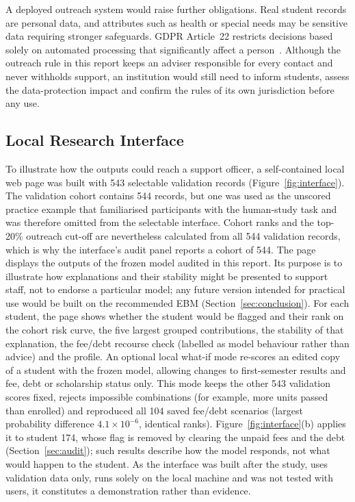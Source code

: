 A deployed outreach system would raise further obligations. Real student records are personal data,
and attributes such as health or special needs may be sensitive data requiring stronger safeguards.
GDPR Article~22 restricts decisions based solely on automated processing that significantly affect a
person~\citep{gdpr2016,wachter2017counterfactual}. Although the outreach rule in this report keeps an
adviser responsible for every contact and never withholds support, an institution would still need
to inform students, assess the data-protection impact and confirm the rules of its own jurisdiction
before any use.

\subsection{Local Research Interface}
\label{sec:app-interface}

To illustrate how the outputs could reach a support officer, a self-contained local web page was
built with 543 selectable validation records (Figure~\ref{fig:interface}). The validation cohort
contains 544 records, but one was used as the unscored practice example that familiarised
participants with the human-study task and was therefore omitted from the selectable interface.
Cohort ranks and the top-20\% outreach cut-off are nevertheless calculated from all 544 validation
records, which is why the interface's audit panel reports a cohort of 544. The page displays the
outputs of the frozen \tabicl model audited in this report. Its purpose is to illustrate
how explanations and their stability might be presented to support staff, not to endorse a
particular model; any future version intended for practical use would be built on the recommended
EBM (Section~\ref{sec:conclusion}). For each
student, the page shows whether the student would be flagged and their rank on the cohort risk
curve, the five largest grouped contributions, the stability of that explanation, the fee/debt
recourse check (labelled as model behaviour rather than advice) and the profile. An optional local
what-if mode re-scores an edited copy of a student with the frozen \tabicl model, allowing changes to
first-semester results and fee, debt or scholarship status only. This mode keeps the other 543
validation scores fixed, rejects impossible combinations (for example, more units passed than enrolled) and
reproduced all 104 saved fee/debt scenarios (largest probability difference $4.1\times10^{-6}$,
identical ranks). Figure~\ref{fig:interface}(b) applies it to student 174, whose flag is removed by
clearing the unpaid fees and the debt (Section~\ref{sec:audit}); such results describe how the
model responds, not what would happen to the student. As the interface was built after the study,
uses validation data only, runs solely on the local machine and was not tested with users, it
constitutes a demonstration rather than evidence.


